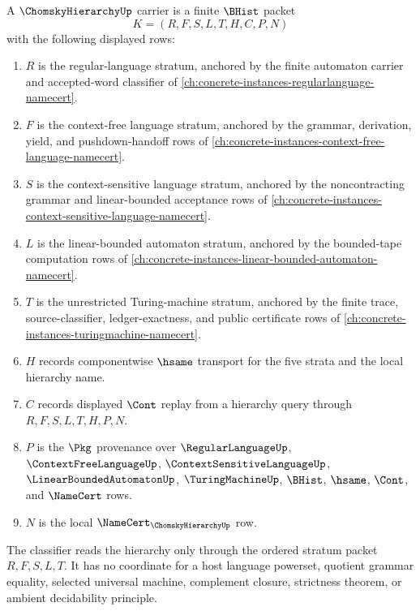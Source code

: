 \begin{definition}
\label{def:chomsky-hierarchy-carrier}
A $\ChomskyHierarchyUp$ carrier is a finite $\BHist$ packet
$$
K=(R,F,S,L,T,H,C,P,N)
$$
with the following displayed rows:
\begin{enumerate}
\item $R$ is the regular-language stratum, anchored by the finite automaton carrier and accepted-word classifier of \autoref{ch:concrete-instances-regularlanguage-namecert}.
\item $F$ is the context-free language stratum, anchored by the grammar, derivation, yield, and pushdown-handoff rows of \autoref{ch:concrete-instances-context-free-language-namecert}.
\item $S$ is the context-sensitive language stratum, anchored by the noncontracting grammar and linear-bounded acceptance rows of \autoref{ch:concrete-instances-context-sensitive-language-namecert}.
\item $L$ is the linear-bounded automaton stratum, anchored by the bounded-tape computation rows of \autoref{ch:concrete-instances-linear-bounded-automaton-namecert}.
\item $T$ is the unrestricted Turing-machine stratum, anchored by the finite trace, source-classifier, ledger-exactness, and public certificate rows of \autoref{ch:concrete-instances-turingmachine-namecert}.
\item $H$ records componentwise $\hsame$ transport for the five strata and the local hierarchy name.
\item $C$ records displayed $\Cont$ replay from a hierarchy query through $R,F,S,L,T,H,P,N$.
\item $P$ is the $\Pkg$ provenance over $\RegularLanguageUp$, $\ContextFreeLanguageUp$, $\ContextSensitiveLanguageUp$, $\LinearBoundedAutomatonUp$, $\TuringMachineUp$, $\BHist$, $\hsame$, $\Cont$, and $\NameCert$ rows.
\item $N$ is the local $\NameCert_{\ChomskyHierarchyUp}$ row.
\end{enumerate}
The classifier reads the hierarchy only through the ordered stratum packet $R,F,S,L,T$. It has no coordinate for a host language powerset, quotient grammar equality, selected universal machine, complement closure, strictness theorem, or ambient decidability principle.
\end{definition}

